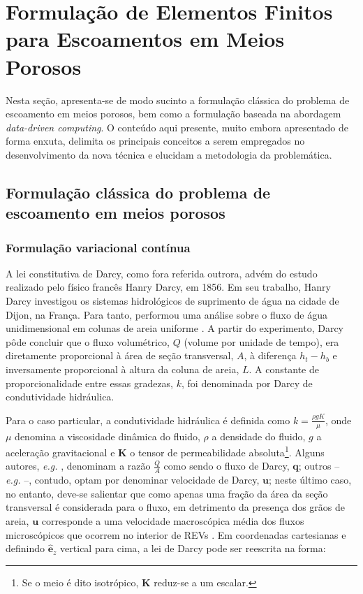 \section{Formulação de Elementos Finitos para Escoamentos em Meios Porosos}

Nesta seção, apresenta-se de modo sucinto a formulação clássica do problema de escoamento em meios porosos, bem como a formulação baseada na abordagem \textit{data-driven computing}. O conteúdo aqui presente, muito embora apresentado de forma enxuta, delimita os principais conceitos a serem empregados no desenvolvimento da nova técnica e elucidam a metodologia da problemática. 

\subsection{Formulação clássica do problema de escoamento em meios porosos}

\subsubsection{Formulação variacional contínua}

A lei constitutiva de Darcy, como fora referida outrora, advém do estudo realizado pelo físico francês Hanry Darcy, em 1856. Em seu trabalho, Hanry Darcy investigou os sistemas hidrológicos de suprimento de água na cidade de Dijon, na França. Para tanto, performou uma análise sobre o fluxo de água unidimensional em colunas de areia uniforme \cite{Darcy1856}. A partir do experimento, Darcy pôde concluir que o fluxo volumétrico, $Q$ (volume por unidade de tempo), era diretamente proporcional à área de seção transversal, $A$, à diferença $h_{t}-h_{b}$ e inversamente proporcional à altura da coluna de areia, $L$. A constante de proporcionalidade entre essas gradezas, $k$, foi denominada por Darcy de condutividade hidráulica.

Para o caso particular, a condutividade hidráulica é definida como $k = \frac{\rho g K}{\mu}$, onde $\mu$ denomina a viscosidade dinâmica do fluido, $ \rho $ a densidade do fluido, $ g $ a aceleração gravitacional e $ \mathbf{K} $ o tensor de permeabilidade absoluta\footnote{Se o meio é dito isotrópico, $ \mathbf{K} $ reduz-se a um escalar.}. Alguns autores, \textit{e.g.} \cite{Sousa2023}, denominam a razão $\frac{Q}{A}$ como sendo o fluxo de Darcy, $\mathbf{q}$; outros -- \textit{e.g.} \cite{Jambhekar2011} --, contudo, optam por denominar velocidade de Darcy, $\mathbf{u}$; neste último caso, no entanto, deve-se salientar que como apenas uma fração da área da seção transversal é considerada para o fluxo, em detrimento da presença dos grãos de areia, $\mathbf{u}$ corresponde a uma velocidade macroscópica média dos fluxos microscópicos que ocorrem no interior de REVs \cite{Sousa2023,Freeze1979}.     
Em coordenadas cartesianas e definindo $\mathbf{\hat{e}}_{z}$ vertical para cima, a lei de Darcy pode ser reescrita na forma:

